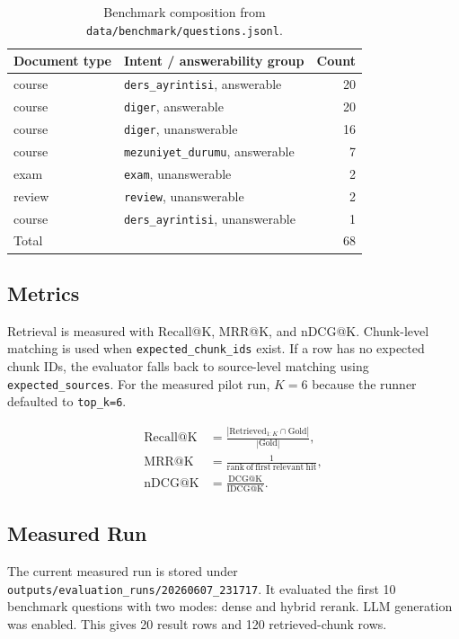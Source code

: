 \documentclass[11pt]{article}
\begin{document}
\begin{table}[H]
\centering
\caption{Benchmark composition from \texttt{data/benchmark/questions.jsonl}.}
\label{tab:benchmark-composition}
\begin{tabular}{llr}
\toprule
Document type & Intent / answerability group & Count \\
\midrule
course & \texttt{ders\_ayrintisi}, answerable & 20 \\
course & \texttt{diger}, answerable & 20 \\
course & \texttt{diger}, unanswerable & 16 \\
course & \texttt{mezuniyet\_durumu}, answerable & 7 \\
exam & \texttt{exam}, unanswerable & 2 \\
review & \texttt{review}, unanswerable & 2 \\
course & \texttt{ders\_ayrintisi}, unanswerable & 1 \\
\midrule
Total & & 68 \\
\bottomrule
\end{tabular}
\end{table}

\subsection{Metrics}
Retrieval is measured with Recall@K, MRR@K, and nDCG@K. Chunk-level matching is used when \texttt{expected\_chunk\_ids} exist. If a row has no expected chunk IDs, the evaluator falls back to source-level matching using \texttt{expected\_sources}. For the measured pilot run, $K=6$ because the runner defaulted to \texttt{top\_k=6}.

\begin{align}
\mathrm{Recall@K} &= \frac{|\mathrm{Retrieved}_{1:K} \cap \mathrm{Gold}|}{|\mathrm{Gold}|},\\
\mathrm{MRR@K} &= \frac{1}{\mathrm{rank\ of\ first\ relevant\ hit}},\\
\mathrm{nDCG@K} &= \frac{\mathrm{DCG@K}}{\mathrm{IDCG@K}}.
\end{align}

\subsection{Measured Run}
The current measured run is stored under \texttt{outputs/evaluation\_runs/20260607\_231717}. It evaluated the first 10 benchmark questions with two modes: dense and hybrid rerank. LLM generation was enabled. This gives 20 result rows and 120 retrieved-chunk rows.
\end{document}
